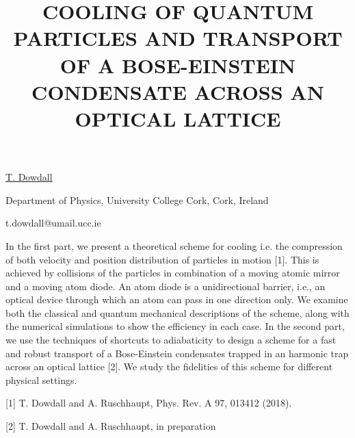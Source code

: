 \title{COOLING OF QUANTUM PARTICLES AND TRANSPORT OF A BOSE-EINSTEIN CONDENSATE ACROSS AN OPTICAL LATTICE}

\underline{T. Dowdall}  

{\normalsize{\vspace{-4mm}
Department of Physics,
University College Cork,
Cork,
Ireland



\email t.dowdall@umail.ucc.ie}}

In the first part,  we present a theoretical scheme for cooling i.e. the
compression of both velocity and position distribution of particles in
motion [1]. This is achieved by collisions of the particles in
combination of a moving atomic mirror and a moving atom diode. An atom
diode is a unidirectional barrier, i.e., an optical device through which
an atom can pass in one direction only. We examine both the classical
and quantum mechanical descriptions of the scheme, along with the
numerical simulations to show the efficiency in each case. In the second
part, we use the techniques of shortcuts to adiabaticity to design a
scheme for a fast and robust transport of a Bose-Einstein condensates
trapped in an harmonic trap across an optical lattice [2]. We study the
fidelities of this scheme for different physical settings.

{\normalsize
[1] T. Dowdall and A. Ruschhaupt, Phys. Rev. A 97, 013412 (2018).
\vsp

[2] T. Dowdall and A. Ruschhaupt, in preparation
}

\vspace{\baselineskip}